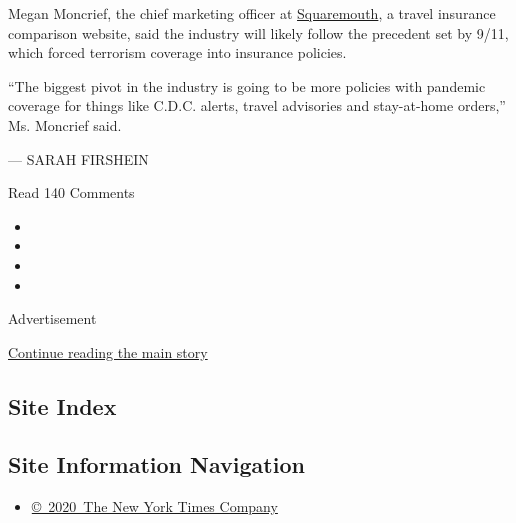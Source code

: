 Megan Moncrief, the chief marketing officer at
\href{https://www.squaremouth.com/}{Squaremouth}, a travel insurance
comparison website, said the industry will likely follow the precedent
set by 9/11, which forced terrorism coverage into insurance policies.

``The biggest pivot in the industry is going to be more policies with
pandemic coverage for things like C.D.C. alerts, travel advisories and
stay-at-home orders,'' Ms. Moncrief said.

--- SARAH FIRSHEIN

Read 140 Comments

\begin{itemize}
\item
\item
\item
\item
\end{itemize}

Advertisement

\protect\hyperlink{after-bottom}{Continue reading the main story}

\hypertarget{site-index}{%
\subsection{Site Index}\label{site-index}}

\hypertarget{site-information-navigation}{%
\subsection{Site Information
Navigation}\label{site-information-navigation}}

\begin{itemize}
\tightlist
\item
  \href{https://help.nytimes.com/hc/en-us/articles/115014792127-Copyright-notice}{©~2020~The
  New York Times Company}
\end{itemize}

